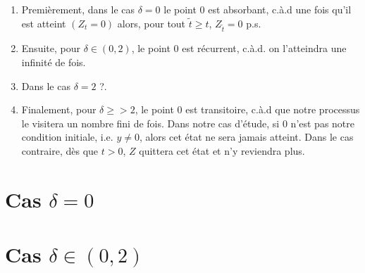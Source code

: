 \documentclass[openany]{book}
\newcommand{\1}{\mathbbm{1}}
\theoremstyle{thmfont}
\theoremstyle{deffont}
\theoremstyle{thmfont}
\theoremstyle{deffont}
\begin{document}
\begin{enumerate}
    \item Premièrement, dans le cas $\delta = 0$ le point $0$ est absorbant, c.à.d une fois qu'il est atteint $(Z_t = 0)$ alors, pour tout $\tilde{t} \geq t$, $Z_{\tilde{t}} = 0$ p.s.
    \item Ensuite, pour $\delta \in (0,2)$, le point $0$ est récurrent, c.à.d. on l'atteindra une infinité de fois.
    \item Dans le cas $\delta = 2$ {\color{purple} ?}.
    \item Finalement, pour $\delta \ge> 2$, le point $0$ est transitoire, c.à.d que notre processus le visitera un nombre fini de fois. Dans notre cas d'étude, si $0$ n'est pas notre condition initiale, i.e. $y \neq 0$, alors cet état ne sera jamais atteint. Dans le cas contraire, dès que $t>0$, $Z$ quittera cet état et n'y reviendra plus.
\end{enumerate}

\section{Cas $\delta = 0$}
\section{Cas $\delta \in (0,2)$}
\end{document}
